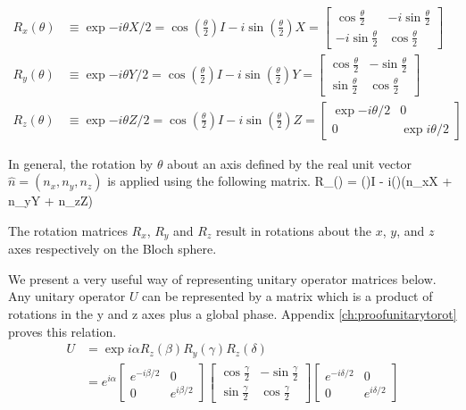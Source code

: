 \begin{align}
R_x(\theta) &\equiv \exp{-i\theta X/2} = \cos\left(\frac{\theta}{2}\right)I - i\sin\left(\frac{\theta}{2}\right)X = 
\left[\begin{array}{cc}\cos\frac{\theta}{2} & -i\sin\frac{\theta}{2}\\
-i\sin\frac{\theta}{2} & \cos\frac{\theta}{2}\end{array}\right]\\ 
R_y(\theta) &\equiv \exp{-i\theta Y/2} = \cos\left(\frac{\theta}{2}\right)I - i\sin\left(\frac{\theta}{2}\right)Y = 
\left[\begin{array}{cc}\cos\frac{\theta}{2} & -\sin\frac{\theta}{2}\\
\sin\frac{\theta}{2} & \cos\frac{\theta}{2}\end{array}\right]\\ 
R_z(\theta) &\equiv \exp{-i\theta Z/2} = \cos\left(\frac{\theta}{2}\right)I - i\sin\left(\frac{\theta}{2}\right)Z = 
\left[\begin{array}{cc}\exp{-i\theta/2} & 0\\
0 & \exp{i\theta/2}\end{array}\right]
\end{align}

In general, the rotation by $\theta$ about an axis defined by the real unit vector $\hat{n} = (n_x,n_y,n_z)$ is applied using the following matrix.
\beq
R_{}(\theta) \equiv {} = \cos\left(\right)I - i\sin\left(\right)(n_xX + n_yY + n_zZ)
\eeq

The rotation matrices $R_x$, $R_y$ and $R_z$ result in rotations about the $x$, $y$, and $z$ axes respectively on the Bloch sphere. 

We present a very useful way of representing unitary operator matrices below. Any unitary operator $U$ can be represented by a matrix which is a product of rotations in the y and z axes plus a global phase. Appendix \ref{ch:proofunitarytorot} proves this relation.
\begin{align}
\label{eq:unitarytosinglerot}
U &= \exp{i\alpha}R_z(\beta)R_y(\gamma)R_z(\delta)\\ 
&= e^{i\alpha}\left[\begin{array}{cc}e^{-i\beta/2} & 0\\
0 & e^{i\beta/2}\end{array}\right]
\left[\begin{array}{cc}\cos\frac{\gamma}{2} & -\sin\frac{\gamma}{2}\\
\sin\frac{\gamma}{2} & \cos\frac{\gamma}{2}\end{array}\right] 
\left[\begin{array}{cc}e^{-i\delta/2} & 0\\
0 & e^{i\delta/2}\end{array}\right]
\end{align}

